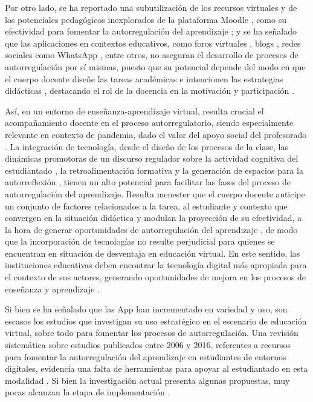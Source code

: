 \documentclass[spanish]{textolivre}
\begin{document}
Por otro lado, se ha reportado una subutilización de los recursos virtuales y de los potenciales pedagógicos inexplorados de la plataforma Moodle \cite[p. 74]{valenzuela2013}, como su efectividad para fomentar la autorregulación del aprendizaje \cite[p. 495]{martinez-sarmiento2018}; y se ha señalado que las aplicaciones en contextos educativos, como foros virtuales \cite[p. 37]{castro2016}, blogs \cite[p. 182]{delgado2018}, redes sociales como WhatsApp \cite[p. 80]{weepiu2020}, entre otros, no aseguran el desarrollo de procesos de autorregulación por sí mismas, puesto que su potencial depende del modo en que el cuerpo docente diseñe las tareas académicas \cite[p. 17]{valencia2017} e intencionen las estrategias didácticas \cite[p. 80]{weepiu2020}, destacando el rol de la docencia en la motivación y participación \cite[p. 37]{castro2016}.

Así, en un entorno de enseñanza-aprendizaje virtual, resulta crucial el acompañamiento docente en el proceso autorregulatorio, siendo especialmente relevante en contexto de pandemia, dado el valor del apoyo social del profesorado \cite[p. 17]{lopezangulo2020}. La integración de tecnología, desde el diseño de los procesos de la clase, las dinámicas promotoras de un discurso regulador sobre la actividad cognitiva del estudiantado \cite[p. 8]{ninocarrasco2019}, la retroalimentación formativa y la generación de espacios para la autorreflexión \cite[p. 272]{valencia-serrano2020}, tienen un alto potencial para facilitar las fases del proceso de autorregulación del aprendizaje. Resulta menester que el cuerpo docente anticipe un conjunto de factores relacionados a la tarea, al estudiante y contexto que convergen en la situación didáctica y modulan la proyección de su efectividad, a la hora de generar oportunidades de autorregulación del aprendizaje \cite{castro2016, valencia2017}, de modo que la incorporación de tecnologías no resulte perjudicial para quienes se encuentran en situación de desventaja en educación virtual. En este sentido, las instituciones educativas deben encontrar la tecnología digital más apropiada para el contexto de sus actores, generando oportunidades de mejora en los procesos de enseñanza y aprendizaje \cite[p. 54]{instituto_internacional_para_la_educacion_superior_en_america_latina_y_el_caribe_covid-19_2020}.

Si bien se ha señalado que las App han incrementado en variedad y uso, son escasos los estudios que investigan su uso estratégico en el escenario de educación virtual, sobre todo para fomentar los procesos de autorregulación. Una revisión sistemática sobre estudios publicados entre 2006 y 2016, referentes a recursos para fomentar la autorregulación del aprendizaje en estudiantes de entornos digitales, evidencia una falta de herramientas para apoyar al estudiantado en esta modalidad \cite{wong2018}. Si bien la investigación actual presenta algunas propuestas, muy pocas alcanzan la etapa de implementación \cite[p. 1096]{perezalvarez2018}.
\end{document}
